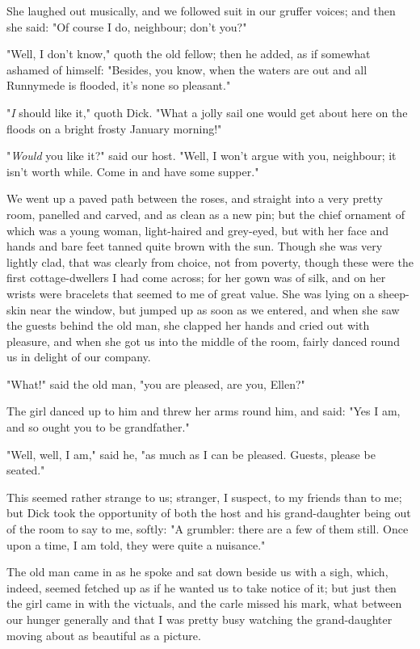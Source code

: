 She laughed out musically, and we followed suit in our gruffer voices;
and then she said: "Of course I do, neighbour; don't you?"

"Well, I don't know," quoth the old fellow; then he added, as if
somewhat ashamed of himself: "Besides, you know, when the waters are out
and all Runnymede is flooded, it's none so pleasant."

"\emph{I} should like it," quoth Dick. "What a jolly sail one would get
about here on the floods on a bright frosty January morning!"

"\emph{Would} you like it?" said our host. "Well, I won't argue with
you, neighbour; it isn't worth while. Come in and have some supper."

We went up a paved path between the roses, and straight into a very
pretty room, panelled and carved, and as clean as a new pin; but the
chief ornament of which was a young woman, light-haired and grey-eyed,
but with her face and hands and bare feet tanned quite brown with the
sun. Though she was very lightly clad, that was clearly from choice, not
from poverty, though these were the first cottage-dwellers I had come
across; for her gown was of silk, and on her wrists were bracelets that
seemed to me of great value. She was lying on a sheep-skin near the
window, but jumped up as soon as we entered, and when she saw the guests
behind the old man, she clapped her hands and cried out with pleasure,
and when she got us into the middle of the room, fairly danced round us
in delight of our company.

"What!" said the old man, "you are pleased, are you, Ellen?"

The girl danced up to him and threw her arms round him, and said: "Yes I
am, and so ought you to be grandfather."

"Well, well, I am," said he, "as much as I can be pleased. Guests,
please be seated."

This seemed rather strange to us; stranger, I suspect, to my friends
than to me; but Dick took the opportunity of both the host and his
grand-daughter being out of the room to say to me, softly: "A grumbler:
there are a few of them still. Once upon a time, I am told, they were
quite a nuisance."

The old man came in as he spoke and sat down beside us with a sigh,
which, indeed, seemed fetched up as if he wanted us to take notice of
it; but just then the girl came in with the victuals, and the carle
missed his mark, what between our hunger generally and that I was pretty
busy watching the grand-daughter moving about as beautiful as a picture.

